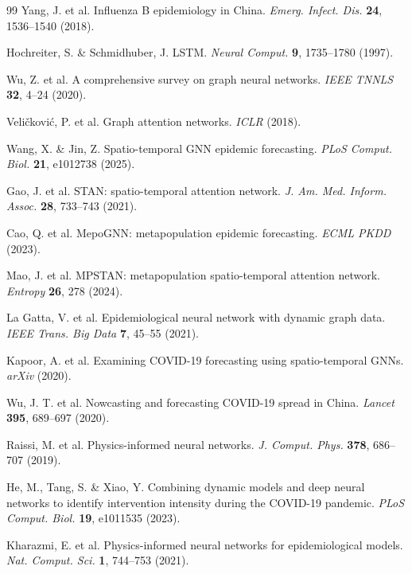 \documentclass[10pt,letterpaper]{article}
\begin{document}
\begin{thebibliography}{99}
		Yang, J. et al. Influenza B epidemiology in China. 
		\textit{Emerg. Infect. Dis.} \textbf{24}, 1536–1540 (2018).
		
		Hochreiter, S. \& Schmidhuber, J. LSTM. 
		\textit{Neural Comput.} \textbf{9}, 1735–1780 (1997).
		
		Wu, Z. et al. A comprehensive survey on graph neural networks. 
		\textit{IEEE TNNLS} \textbf{32}, 4–24 (2020).
		
		Veličković, P. et al. Graph attention networks. 
		\textit{ICLR} (2018).
		
		Wang, X. \& Jin, Z. Spatio-temporal GNN epidemic forecasting. 
		\textit{PLoS Comput. Biol.} \textbf{21}, e1012738 (2025).
		
		Gao, J. et al. STAN: spatio-temporal attention network. 
		\textit{J. Am. Med. Inform. Assoc.} \textbf{28}, 733–743 (2021).
		
		Cao, Q. et al. MepoGNN: metapopulation epidemic forecasting. 
		\textit{ECML PKDD} (2023).
		
		Mao, J. et al. MPSTAN: metapopulation spatio-temporal attention network. 
		\textit{Entropy} \textbf{26}, 278 (2024).
		
		La Gatta, V. et al. Epidemiological neural network with dynamic graph data. 
		\textit{IEEE Trans. Big Data} \textbf{7}, 45–55 (2021).
		
		Kapoor, A. et al. Examining COVID-19 forecasting using spatio-temporal GNNs. 
		\textit{arXiv} (2020).
		
		Wu, J. T. et al. Nowcasting and forecasting COVID-19 spread in China. 
		\textit{Lancet} \textbf{395}, 689–697 (2020).
		
		Raissi, M. et al. Physics-informed neural networks. 
		\textit{J. Comput. Phys.} \textbf{378}, 686–707 (2019).
		
		He, M., Tang, S. \& Xiao, Y. Combining dynamic models and deep neural networks to identify intervention intensity during the COVID-19 pandemic. 
		\textit{PLoS Comput. Biol.} \textbf{19}, e1011535 (2023).
		
		Kharazmi, E. et al. Physics-informed neural networks for epidemiological models. 
		\textit{Nat. Comput. Sci.} \textbf{1}, 744–753 (2021).
		

\end{thebibliography}
\end{document}
